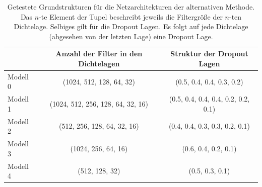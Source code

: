 %
%
\begin{table}
  \centering%
  \begin{tabular}{l
                  c
                  c}
      \toprule
      {}    & Anzahl der Filter in den Dichtelagen  & Struktur der Dropout Lagen      \\
      \midrule
      Modell 0    & (1024, 512, 128, 64, 32)  & (0.5, 0.4, 0.4, 0.3, 0.2) \\
      Modell 1    & (1024, 512, 256, 128, 64, 32, 16)  & (0.5, 0.4, 0.4, 0.4, 0.2, 0.2, 0.1) \\
      Modell 2    & (512, 256, 128, 64, 32, 16)  & (0.4, 0.4, 0.3, 0.3, 0.2, 0.1) \\
      Modell 3    & (1024, 256, 64, 16)  & (0.6, 0.4, 0.2, 0.1) \\
      Modell 4    & (512, 128, 32)  & (0.5, 0.3, 0.1) \\
      \bottomrule
  \end{tabular}
  \caption{Getestete Grundstrukturen für die Netzarchitekturen der alternativen Methode. Das $n$-te Element der Tupel beschreibt jeweils die Filtergröße der $n$-ten Dichtelage. Selbiges gilt für die Dropout Lagen. Es folgt auf jede Dichtelage (abgesehen von der letzten Lage) eine Dropout Lage.}
  \label{tab:grid}
\end{table}
%
%
